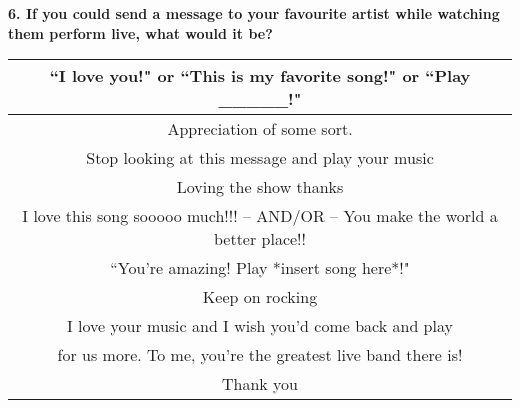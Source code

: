 \begin{center}
\vspace{1cm}

\textbf{6. If you could send a message to your favourite artist while watching them perform live, what would it be?}\\[0.25cm]
\begin{tabular}{|c|}
\hline
``I love you!" or ``This is my favorite song!" or ``Play \_\_\_\_\_!"\\ \hline
Appreciation of some sort.\\ \hline
Stop looking at this message and play your music\\ \hline
Loving the show thanks\\ \hline
I love this song sooooo much!!! -- AND/OR -- You make the world a better place!!\\ \hline
``You're amazing! Play *insert song here*!"\\ \hline
Keep on rocking\\ \hline
I love your music and I wish you'd come back and play\\
for us more. To me, you're the greatest live band there is!\\ \hline
Thank you\\
\hline
\end{tabular}


\end{center}
